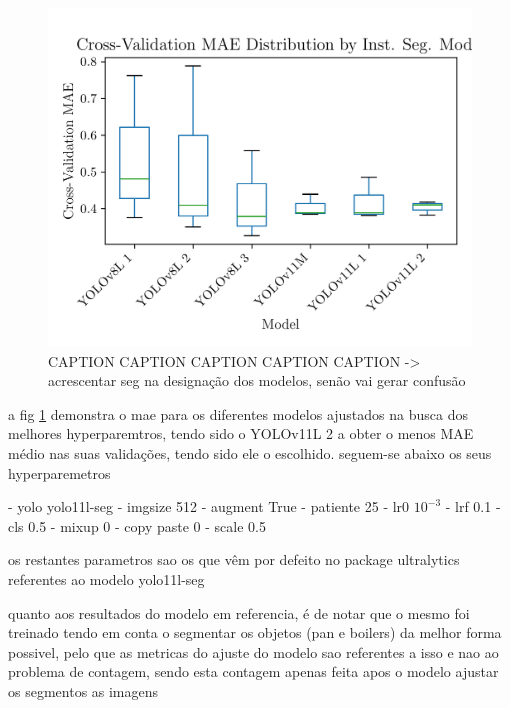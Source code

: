 \documentclass[conference]{IEEEtran}
\begin{document}
\begin{figure}[H]
    \centering
    \includegraphics[width=1\linewidth]{assets/model02_mae_boxplot.png}
    \caption{CAPTION CAPTION CAPTION CAPTION CAPTION -> acrescentar seg na designação dos modelos, senão vai gerar confusão}
    \label{fig:model02_mae_boxplot}
\end{figure}

a fig \ref{fig:model02_mae_boxplot} demonstra o mae para os diferentes modelos ajustados na busca dos melhores hyperparemtros, tendo sido o YOLOv11L 2 a obter o menos MAE médio nas suas validações, tendo sido ele o escolhido. seguem-se abaixo os seus hyperparemetros

- yolo yolo11l-seg
- imgsize 512
- augment True
- patiente 25
- lr0 $10^{-3}$
- lrf 0.1
- cls 0.5
- mixup 0
- copy paste 0
- scale 0.5

os restantes parametros sao os que vêm por defeito no package ultralytics
referentes ao modelo yolo11l-seg

quanto aos resultados do modelo em referencia, é de notar que o mesmo foi treinado tendo em conta o segmentar os objetos (pan e boilers) da melhor forma possivel, pelo que as metricas do ajuste do modelo sao referentes a isso e nao ao problema de contagem, sendo esta contagem apenas feita apos o modelo ajustar os segmentos as imagens
\end{document}
